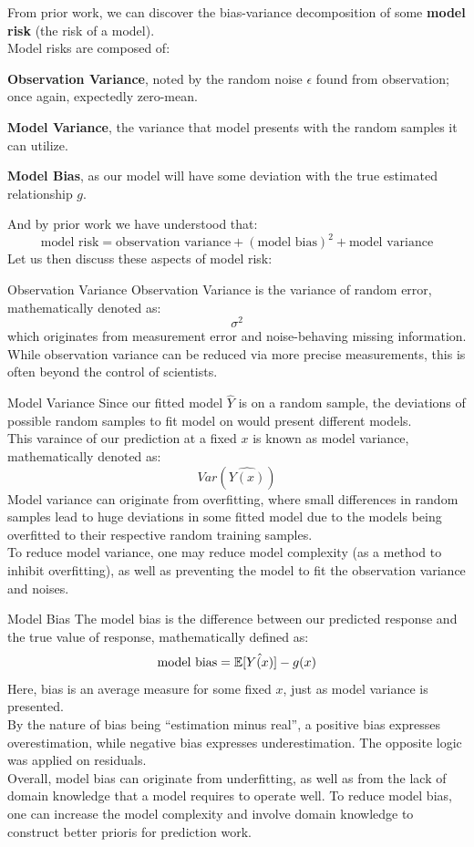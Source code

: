 From prior work, we can discover the bias-variance decomposition of some \textbf{model risk} (the risk of a model). \\
Model risks are composed of:
\begin{bindenum}
    \item \textbf{Observation Variance}, noted by the random noise $\epsilon$ found from observation; once again, expectedly zero-mean.
    \item \textbf{Model Variance}, the variance that model presents with the random samples it can utilize.
    \item \textbf{Model Bias}, as our model will have some deviation with the true estimated relationship $g$.
\end{bindenum}
And by prior work we have understood that:
\[
    \text{model risk} = \text{observation variance} + {(\text{model bias})}^2 + \text{model variance}
\]
Let us then discuss these aspects of model risk:
\begin{ln-define}{Observation Variance}{}
    Observation Variance is the variance of random error, mathematically denoted as:
    \[\sigma^2\]
    which originates from measurement error and noise-behaving missing information. \\
    While observation variance can be reduced via more precise measurements, this is often beyond the control of scientists.
\end{ln-define}
\begin{ln-define}{Model Variance}{}
    Since our fitted model $\hat{Y}$ is on a random sample, the deviations of possible random samples to fit model on would present different models. \\
    This varaince of our prediction at a fixed $x$ is known as model variance, mathematically denoted as:
    \[Var(\hat{Y(x)})\]
    Model variance can originate from overfitting, where small differences in random samples lead to huge deviations in some fitted model due to the models being overfitted to their respective random training samples. \\
    To reduce model variance, one may reduce model complexity (as a method to inhibit overfitting), as well as preventing the model to fit the observation variance and noises.
\end{ln-define}
\begin{ln-define}{Model Bias}{}
    The model bias is the difference between our predicted response and the true value of response, mathematically defined as:
    \[\text{model bias} = \mathbb{E}[\hat{Y(x)}] - g(x)\]
    Here, bias is an average measure for some fixed $x$, just as model variance is presented. \\
    By the nature of bias being ``estimation minus real'', a positive bias expresses overestimation, while negative bias expresses underestimation. The opposite logic was applied on residuals. \\
    Overall, model bias can originate from underfitting, as well as from the lack of domain knowledge that a model requires to operate well. To reduce model bias, one can increase the model complexity and involve domain knowledge to construct better prioris for prediction work.
\end{ln-define}
